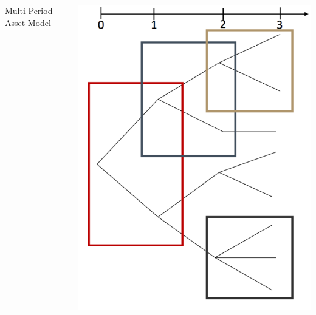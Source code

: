 \documentclass[aspectratio=1610]{beamer}
\begin{document}
\begin{frame}
\begin{columns}
\begin{column}{0.58\textwidth} \centering
  \huge{Multi-Period Asset Model}
\end{column}
\begin{column}{0.4\textwidth}
  \includegraphics[height=0.85\textheight]{images/multi-period.PNG}
\end{column}
\end{columns}
\end{frame}
\end{document}
